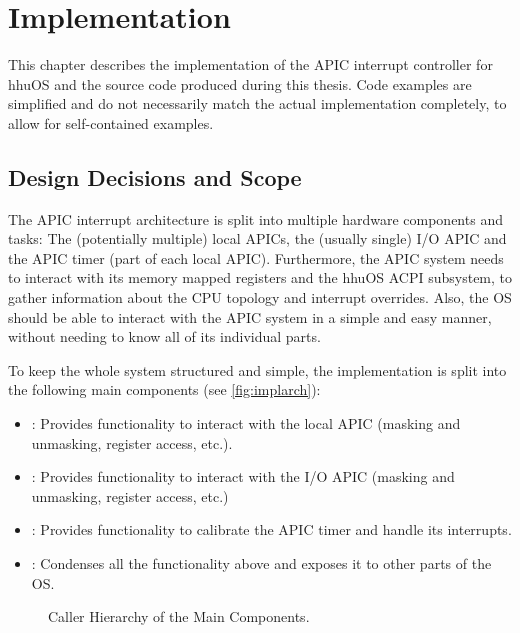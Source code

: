 \chapter{Implementation}
\label{ch:implementation}

This chapter describes the implementation of the APIC interrupt controller for hhuOS and the source code produced during this thesis.
Code examples are simplified and do not necessarily match the actual implementation completely, to allow for self-contained examples.

\clearpage

\section{Design Decisions and Scope}
\label{sec:design}

The APIC interrupt architecture is split into multiple hardware components and tasks: The (potentially multiple) local APICs, the (usually single) I/O APIC and the APIC timer (part of each local APIC).
Furthermore, the APIC system needs to interact with its memory mapped registers and the hhuOS ACPI subsystem, to gather information about the CPU topology and interrupt overrides.
Also, the OS should be able to interact with the APIC system in a simple and easy manner, without needing to know all of its individual parts.

To keep the whole system structured and simple, the implementation is split into the following main components (see \autoref{fig:implarch}):

\begin{itemize}
  \item {}: Provides functionality to interact with the local APIC (masking and unmasking, register access, etc.).
  \item {}: Provides functionality to interact with the I/O APIC (masking and unmasking, register access, etc.)
  \item {}: Provides functionality to calibrate the APIC timer and handle its interrupts.
  \item {}: Condenses all the functionality above and exposes it to other parts of the OS\@.
\end{itemize}

\begin{figure}[h]
  \centering
  \begin{subfigure}[b]{0.5\textwidth}
    
  \end{subfigure}
  \caption{Caller Hierarchy of the Main Components.}
  \label{fig:implarch}
\end{figure}

